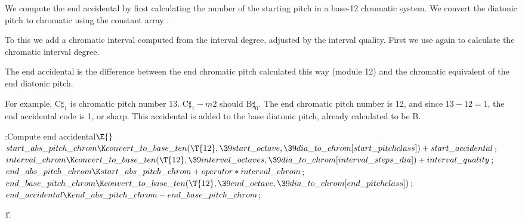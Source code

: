 We compute the end accidental by first calculating the number of the
starting
pitch in a base-12 chromatic system.
We convert the diatonic pitch to chromatic using the constant array .

To this we add a chromatic interval computed from the interval degree, adjusted
by the interval quality.
First we use  again to calculate the chromatic interval
degree.

The end accidental is the difference between the end chromatic pitch calculated
this way (module 12) and the chromatic equivalent of the end diatonic pitch.

For example, C$\sharp_1$ is chromatic pitch number 13. C$\sharp_1 - m2$ should
B$\sharp_0$.
The end chromatic pitch number is 12, and since $ 13 - 12 = 1 $, the end
accidental code is 1, or sharp.
This accidental is added to the base diatonic pitch, already calculated to be
B.

\Y\B\4:Compute end accidental\X${}\E{}$\6
$\\{start\_abs\_pitch\_chrom}\K\\{convert\_to\_base\_ten}(\T{12},\39\\{start%
\_octave},\39\\{dia\_to\_chrom}[\\{start\_pitchclass}])+\\{start%
\_accidental}{}$;\7
${}\\{interval\_chrom}\K\\{convert\_to\_base\_ten}(\T{12},\39\\{interval%
\_octaves},\39\\{dia\_to\_chrom}[\\{interval\_steps\_dia}])+\\{interval%
\_quality}{}$;\7
${}\\{end\_abs\_pitch\_chrom}\K\\{start\_abs\_pitch\_chrom}+\\{operator}*%
\\{interval\_chrom}{}$;\7
${}\\{end\_base\_pitch\_chrom}\K\\{convert\_to\_base\_ten}(\T{12},\39\\{end%
\_octave},\39\\{dia\_to\_chrom}[\\{end\_pitchclass}]){}$;\7
${}\\{end\_accidental}\K\\{end\_abs\_pitch\_chrom}-\\{end\_base\_pitch%
\_chrom}{}$;\par
\U1.\fi


